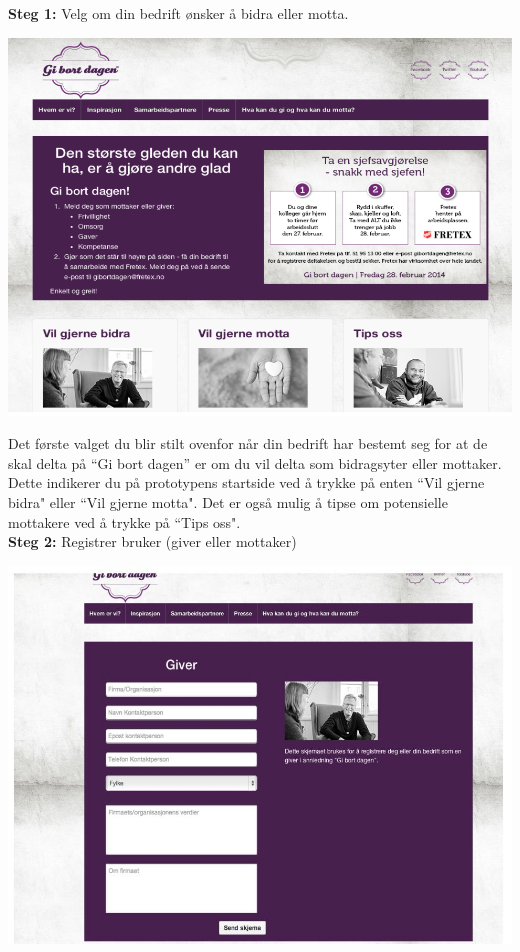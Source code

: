 {\bf Steg 1:} Velg om din bedrift ønsker å bidra eller motta.
\begin{center}
\includegraphics[clip=true, width=1 \textwidth,
trim=0cm 0cm 0cm 0cm]{startside.png}
\label{fig:startside}
\end{center}

Det første valget du blir stilt ovenfor når din bedrift har bestemt seg for at de skal delta på “Gi bort dagen” er om du vil delta som bidragsyter eller mottaker. Dette indikerer du på prototypens startside ved å trykke på enten ``Vil gjerne bidra" eller ``Vil gjerne motta". Det er også mulig å tipse om potensielle mottakere ved å trykke på ``Tips oss".\\

{\bf Steg 2:} Registrer bruker (giver eller mottaker)
\begin{center}
\includegraphics[clip=true, width=1 \textwidth,
trim=0cm 0cm 0cm 0cm]{registreringavbruker.jpg}
\label{fig:registrering}
\end{center}

